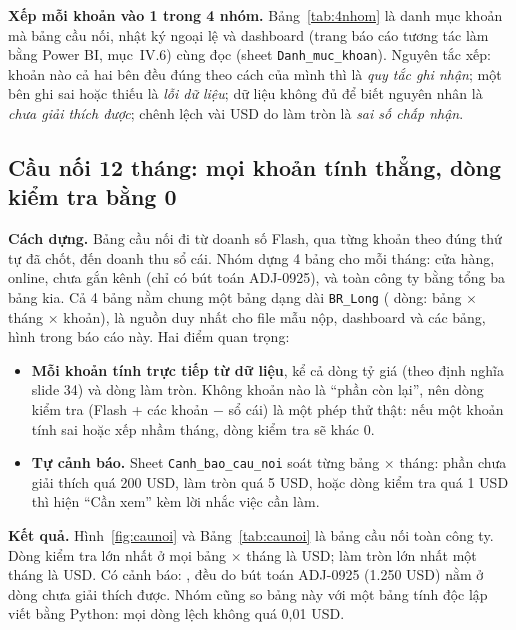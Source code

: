 \textbf{Xếp mỗi khoản vào 1 trong 4 nhóm.} Bảng~\ref{tab:4nhom} là danh mục khoản mà bảng cầu nối, nhật ký ngoại lệ và dashboard (trang báo cáo tương tác làm bằng Power BI, mục~IV.6) cùng đọc (sheet \texttt{Danh\_muc\_khoan}). Nguyên tắc xếp: khoản nào cả hai bên đều đúng theo cách của mình thì là \emph{quy tắc ghi nhận}; một bên ghi sai hoặc thiếu là \emph{lỗi dữ liệu}; dữ liệu không đủ để biết nguyên nhân là \emph{chưa giải thích được}; chênh lệch vài USD do làm tròn là \emph{sai số chấp nhận}.

\label{tab:4nhom}\nopagebreak[4]


\subsection{Cầu nối 12 tháng: mọi khoản tính thẳng, dòng kiểm tra bằng 0}

\textbf{Cách dựng.} Bảng cầu nối đi từ doanh số Flash, qua từng khoản theo đúng thứ tự đã chốt, đến doanh thu sổ cái. Nhóm dựng 4 bảng cho mỗi tháng: cửa hàng, online, chưa gắn kênh (chỉ có bút toán ADJ-0925), và toàn công ty bằng tổng ba bảng kia. Cả 4 bảng nằm chung một bảng dạng dài \texttt{BR\_Long} (\SoBRDongDai{} dòng: bảng $\times$ tháng $\times$ khoản), là nguồn duy nhất cho file mẫu nộp, dashboard và các bảng, hình trong báo cáo này. Hai điểm quan trọng:
\begin{itemize}
  \item \textbf{Mỗi khoản tính trực tiếp từ dữ liệu}, kể cả dòng tỷ giá (theo định nghĩa slide 34) và dòng làm tròn. Không khoản nào là ``phần còn lại'', nên dòng kiểm tra (Flash + các khoản $-$ sổ cái) là một phép thử thật: nếu một khoản tính sai hoặc xếp nhầm tháng, dòng kiểm tra sẽ khác 0.
  \item \textbf{Tự cảnh báo.} Sheet \texttt{Canh\_bao\_cau\_noi} soát từng bảng $\times$ tháng: phần chưa giải thích quá 200 USD, làm tròn quá 5 USD, hoặc dòng kiểm tra quá 1 USD thì hiện ``Cần xem'' kèm lời nhắc việc cần làm.
\end{itemize}

\textbf{Kết quả.} Hình~\ref{fig:caunoi} và Bảng~\ref{tab:caunoi} là bảng cầu nối toàn công ty. Dòng kiểm tra lớn nhất ở mọi bảng $\times$ tháng là \SoBRKiemTraMax{} USD; làm tròn lớn nhất một tháng là \SoBRLamTronMax{} USD. Có \SoBRCanhBao{} cảnh báo: \SoBRCanhBaoChiTiet{}, đều do bút toán ADJ-0925 (1.250 USD) nằm ở dòng chưa giải thích được. Nhóm cũng so bảng này với một bảng tính độc lập viết bằng Python: mọi dòng lệch không quá 0,01 USD.

